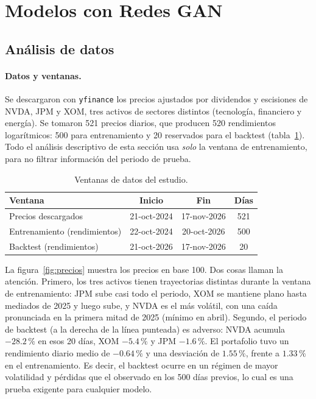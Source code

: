 \documentclass[12pt,letterpaper]{article}
\begin{document}
\section{Modelos con Redes GAN}\label{sec:modelos}

\subsection{Análisis de datos}\label{sec:datos}

\paragraph{Datos y ventanas.}
Se descargaron con \texttt{yfinance} los precios ajustados por dividendos y escisiones de NVDA, JPM y XOM, tres activos de sectores distintos (tecnología, financiero y energía). Se tomaron 521 precios diarios, que producen 520 rendimientos logarítmicos: 500 para entrenamiento y 20 reservados para el backtest (tabla~\ref{tab:ventanas}). Todo el análisis descriptivo de esta sección usa \emph{solo} la ventana de entrenamiento, para no filtrar información del periodo de prueba.

\begin{table}[H]
\centering
\renewcommand{\arraystretch}{1.2}
\begin{tabular}{@{}lccc@{}}
\toprule
\textbf{Ventana} & \textbf{Inicio} & \textbf{Fin} & \textbf{Días}\\
\midrule
Precios descargados & 21-oct-2024 & 17-nov-2026 & 521\\
Entrenamiento (rendimientos) & 22-oct-2024 & 20-oct-2026 & 500\\
Backtest (rendimientos) & 21-oct-2026 & 17-nov-2026 & 20\\
\bottomrule
\end{tabular}
\caption{Ventanas de datos del estudio.}\label{tab:ventanas}
\end{table}

La figura~\ref{fig:precios} muestra los precios en base 100. Dos cosas llaman la atención. Primero, los tres activos tienen trayectorias distintas durante la ventana de entrenamiento: JPM sube casi todo el periodo, XOM se mantiene plano hasta mediados de 2025 y luego sube, y NVDA es el más volátil, con una caída pronunciada en la primera mitad de 2025 (mínimo en abril). Segundo, el periodo de backtest (a la derecha de la línea punteada) es adverso: NVDA acumula $-28.2\,\%$ en esos 20 días, XOM $-5.4\,\%$ y JPM $-1.6\,\%$. El portafolio tuvo un rendimiento diario medio de $-0.64\,\%$ y una desviación de $1.55\,\%$, frente a $1.33\,\%$ en el entrenamiento. Es decir, el backtest ocurre en un régimen de mayor volatilidad y pérdidas que el observado en los 500 días previos, lo cual es una prueba exigente para cualquier modelo.
\end{document}

